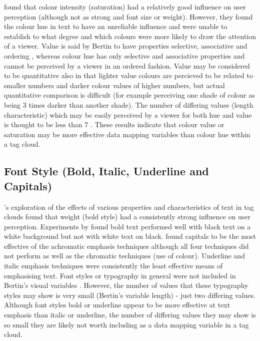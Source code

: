 \citet{bateman08} found that colour intensity (saturation) had a relatively good influence on user perception (although not as strong and font size or weight). However, they found the colour hue in text to have an unreliable influence and were unable to establish to what degree and which colours were more likely to draw the attention of a viewer.  Value is said by Bertin to have properties selective, associative and ordering \citep{bertin83}, whereas colour hue has only selective and associative properties and cannot be perceived by a viewer in an ordered fashion. Value may be considered to be quantitative also in that lighter value colours are percieved to be related to smaller numbers and darker colour values of higher numbers, but actual quantitative comparison is difficult (for example perceiving one shade of colour as being 3 times darker than another shade). The number of differing values (length characteristic) which may be easily perceived by a viewer for both hue and value is thought to be less than 7 \citep{carpendale03}. These results indicate that colour value or saturation may be more effective data mapping variables than colour hue within a tag cloud.

\subsection{Font Style (Bold, Italic, Underline and Capitals)}   

\citet{bateman08}'s exploration of the effects of various properties and characteristics of text in tag clouds found that weight (bold style) had a consistently strong influence on user perception. Experiments by \citet{preston10} found bold text performed well with black text on a white background but not with white text on black.  \citet{preston10} found capitals to be the most effective of the achromatic emphasis techniques although all four techniques did not perform as well as the chromatic techniques (use of colour).  Underline and italic emphasis techniques were consistently the least effective means of emphasising text. Font styles or typography in general were not included in Bertin's visual variables \citet{bertin83}. However, the number of values that these typography styles may show is very small (Bertin's variable length) - just two differing values. Although font styles bold or underline appear to be more effective at text emphasis than italic or underline, the number of differing values they may show is so small they are likely not worth including as a data mapping variable in a tag cloud.

